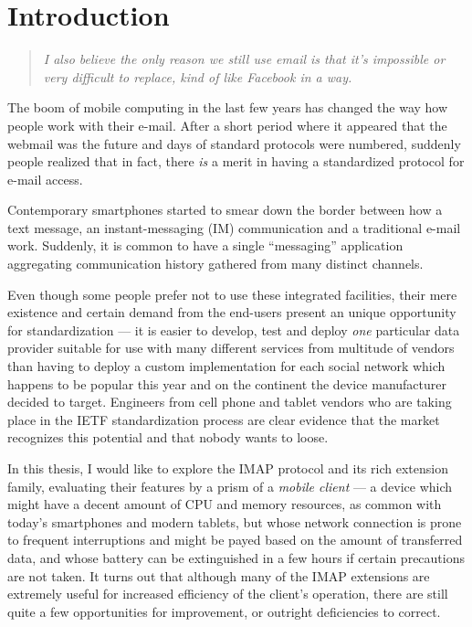 \documentclass[trojita]{subfiles}
\begin{document}
\chapter{Introduction}

\begin{quote}
  \itshape I also believe the only reason we still use email is that it’s impossible or very difficult to replace, kind
  of like Facebook in a way. 
\end{quote}

The boom of mobile computing in the last few years has changed the way how people work with their e-mail.  After a short
period where it appeared that the webmail was the future and days of standard protocols were numbered, suddenly people
realized that in fact, there {\em is} a merit in having a standardized protocol for e-mail access.

Contemporary smartphones started to smear down the border between how a text message, an instant-messaging (IM)
communication and a traditional e-mail work.  Suddenly, it is common to have a single ``messaging'' application
aggregating communication history gathered from many distinct channels.

Even though some people prefer not to use these integrated facilities, their mere existence and certain demand from the
end-users present an unique opportunity for standardization --- it is easier to develop, test and deploy {\em one}
particular data provider suitable for use with many different services from multitude of vendors than having to deploy a
custom implementation for each social network which happens to be popular this year and on the continent the device
manufacturer decided to target.  Engineers from cell phone and tablet vendors who are taking place in the IETF
standardization process are clear evidence that the market recognizes this potential and that nobody wants to loose.

In this thesis, I would like to explore the IMAP protocol \cite{rfc3501} and its rich extension family, evaluating their
features by a prism of a {\em mobile client} --- a device which might have a decent amount of CPU and memory resources,
as common with today's smartphones and modern tablets, but whose network connection is prone to frequent interruptions
and might be payed based on the amount of transferred data, and whose battery can be extinguished in a few hours if
certain precautions are not taken.  It turns out that although many of the IMAP extensions are extremely useful for
increased efficiency of the client's operation, there are still quite a few opportunities for improvement, or outright
deficiencies to correct.
\end{document}
